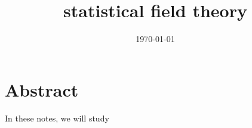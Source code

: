 \documentclass[a4paper, 12pt]{memoir}
\title{statistical field theory}
\date{\today}
\begin{document}
\frontmatter



\tableofcontents

\mainmatter



\chapter*{Abstract}

    In these notes, we will study
    


\backmatter

\clearpage
{}
\printbibliography
\end{document}
